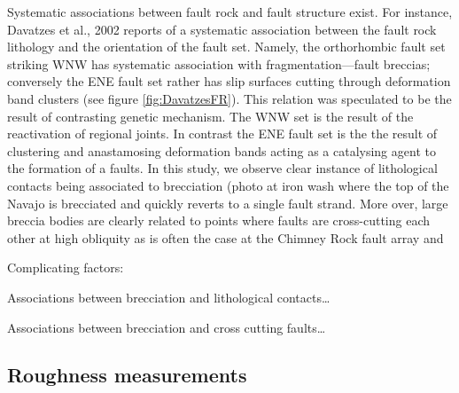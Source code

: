 \documentclass[12pt,a4paper]{article}
\begin{document}
Systematic associations between fault rock and fault structure exist. For instance, Davatzes et al., 2002 reports of a systematic association between the fault rock lithology and the orientation of the fault set. Namely, the orthorhombic fault set striking WNW has systematic association with fragmentation—fault breccias; conversely the ENE fault set rather has slip surfaces cutting through deformation band clusters (see figure \ref{fig:DavatzesFR}). This relation was speculated to be the result of contrasting genetic mechanism. The WNW set is the result of the reactivation of regional joints. In contrast the ENE fault set is the the result of clustering and anastamosing deformation bands acting as a catalysing agent to the formation of a faults.
In this study, we observe clear instance of lithological contacts being associated to brecciation (photo at iron wash where the top of the Navajo is brecciated and quickly reverts to a single fault strand. More over, large breccia bodies are clearly related to points where faults are cross-cutting each other at high obliquity as is often the case at the Chimney Rock fault array and 

Complicating factors:

Associations between brecciation and lithological contacts…

Associations between brecciation and cross cutting faults…

		

\subsection{Roughness measurements}
\end{document}
